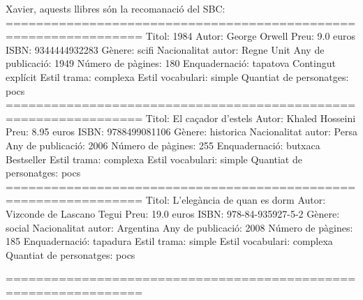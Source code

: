 Xavier, 
aquests llibres són la recomanació del SBC: 
================================================================
Titol:                   1984
Autor:                   George Orwell
Preu:                    9.0 euros
ISBN:                    9344444932283
Gènere:                  scifi
Nacionalitat autor:      Regne Unit
Any de publicació:       1949
Número de pàgines:       180
Enquadernació:           tapatova
Contingut explícit
Estil trama:             complexa
Estil vocabulari:        simple
Quantiat de personatges: pocs
================================================================
Titol:                   El caçador d'estels
Autor:                   Khaled Hosseini
Preu:                    8.95 euros
ISBN:                    9788499081106
Gènere:                  historica
Nacionalitat autor:      Persa
Any de publicació:       2006
Número de pàgines:       255
Enquadernació:           butxaca
Bestseller
Estil trama:             complexa
Estil vocabulari:        simple
Quantiat de personatges: pocs
================================================================
Titol:                   L'elegància de quan es dorm
Autor:                   Vizconde de Lascano Tegui
Preu:                    19.0 euros
ISBN:                    978-84-935927-5-2
Gènere:                  social
Nacionalitat autor:      Argentina
Any de publicació:       2008
Número de pàgines:       185
Enquadernació:           tapadura
Estil trama:             simple
Estil vocabulari:        complexa
Quantiat de personatges: pocs

================================================================
